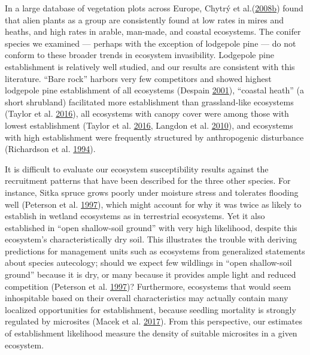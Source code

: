 \documentclass[
]{article}
\begin{document}
In a large database of vegetation plots across Europe, Chytrý et al.(\protect\hyperlink{ref-chytryHabitatInvasionsAlien2008}{2008}\protect\hyperlink{ref-chytryHabitatInvasionsAlien2008}{b}) found that alien plants as a group are consistently found at low rates in mires and heaths, and high rates in arable, man-made, and coastal ecosystems.
The conifer species we examined --- perhaps with the exception of lodgepole pine --- do not conform to these broader trends in ecosystem invasibility.
Lodgepole pine establishment is relatively well studied, and our results are consistent with this literature.
``Bare rock'' harbors very few competitors and showed highest lodgepole pine establishment of all ecosystems (Despain \protect\hyperlink{ref-despainDispersalEcologyLodgepole2001}{2001}), ``coastal heath'' (a short shrubland) facilitated more establishment than grassland-like ecosystems (Taylor et al. \protect\hyperlink{ref-taylorDriversPlantInvasion2016}{2016}), all ecosystems with canopy cover were among those with lowest establishment (Taylor et al. \protect\hyperlink{ref-taylorDriversPlantInvasion2016}{2016}, Langdon et al. \protect\hyperlink{ref-langdonPinusContortaInvasion2010}{2010}), and ecosystems with high establishment were frequently structured by anthropogenic disturbance (Richardson et al. \protect\hyperlink{ref-richardsonPineInvasionsSouthern1994}{1994}).

It is difficult to evaluate our ecosystem susceptibility results against the recruitment patterns that have been described for the three other species.
For instance, Sitka spruce grows poorly under moisture stress and tolerates flooding well (Peterson et al. \protect\hyperlink{ref-petersonEcologyManagementSitka1997}{1997}), which might account for why it was twice as likely to establish in wetland ecosystems as in terrestrial ecosystems.
Yet it also established in ``open shallow-soil ground'' with very high likelihood, despite this ecosystem's characteristically dry soil.
This illustrates the trouble with deriving predictions for management units such as ecosystems from generalized statements about species autecology; should we expect few wildlings in ``open shallow-soil ground'' because it is dry, or many because it provides ample light and reduced competition (Peterson et al. \protect\hyperlink{ref-petersonEcologyManagementSitka1997}{1997})?
Furthermore, ecosystems that would seem inhospitable based on their overall characteristics may actually contain many localized opportunities for establishment, because seedling mortality is strongly regulated by microsites (Macek et al. \protect\hyperlink{ref-macekLifeDeathPicea2017}{2017}).
From this perspective, our estimates of establishment likelihood measure the density of suitable microsites in a given ecosystem.
\end{document}
